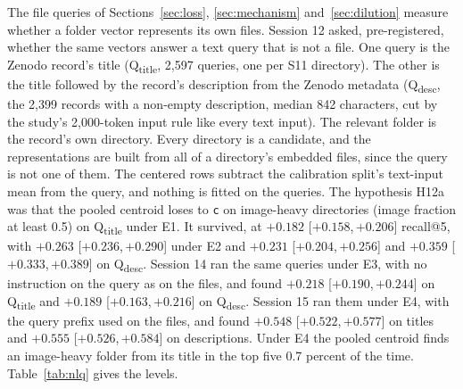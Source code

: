 \documentclass[11pt]{article}
\newcommand{\rep}[1]{\texttt{#1}}
\newcommand{\ci}[2]{[\ensuremath{#1},\,\ensuremath{#2}]}  %
\begin{document}
The file queries of Sections~\ref{sec:loss}, \ref{sec:mechanism} and~\ref{sec:dilution} measure whether a folder vector represents its own files. Session 12 asked, pre-registered, whether the same vectors answer a text query that is not a file. One query is the Zenodo record's title (Q\textsubscript{title}, 2,597 queries, one per S11 directory). The other is the title followed by the record's description from the Zenodo metadata (Q\textsubscript{desc}, the 2,399 records with a non-empty description, median 842 characters, cut by the study's 2,000-token input rule like every text input). The relevant folder is the record's own directory. Every directory is a candidate, and the representations are built from all of a directory's embedded files, since the query is not one of them. The centered rows subtract the calibration split's text-input mean from the query, and nothing is fitted on the queries. The hypothesis H12a was that the pooled centroid loses to \rep{c} on image-heavy directories (image fraction at least 0.5) on Q\textsubscript{title} under E1. It survived, at $+0.182$ \ci{+0.158}{+0.206} recall@5, with $+0.263$ \ci{+0.236}{+0.290} under E2 and $+0.231$ \ci{+0.204}{+0.256} and $+0.359$ \ci{+0.333}{+0.389} on Q\textsubscript{desc}. Session 14 ran the same queries under E3, with no instruction on the query as on the files, and found $+0.218$ \ci{+0.190}{+0.244} on Q\textsubscript{title} and $+0.189$ \ci{+0.163}{+0.216} on Q\textsubscript{desc}. Session 15 ran them under E4, with the query prefix used on the files, and found $+0.548$ \ci{+0.522}{+0.577} on titles and $+0.555$ \ci{+0.526}{+0.584} on descriptions. Under E4 the pooled centroid finds an image-heavy folder from its title in the top five 0.7 percent of the time. Table~\ref{tab:nlq} gives the levels.
\end{document}
